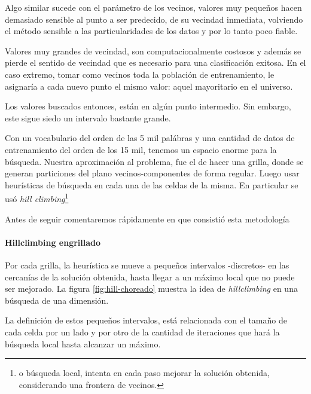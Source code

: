 Algo similar sucede con el parámetro de los vecinos, valores muy
pequeños hacen demasiado sensible al punto a ser predecido, de su
vecindad inmediata, volviendo el método sensible a las
particularidades de los datos y por lo tanto poco fiable.

Valores muy grandes de vecindad, son computacionalmente costosos y
además se pierde el sentido de vecindad que es necesario para una
clasificación exitosa. En el caso extremo, tomar como vecinos toda la
población de entrenamiento, le asignaría a cada nuevo punto el mismo
valor: aquel mayoritario en el universo.

Los valores buscados entonces, están en algún punto intermedio. Sin
embargo, este sigue siedo un intervalo bastante grande.

Con un vocabulario del orden de las 5 mil palábras y una cantidad de
datos de entrenamiento del orden de los 15 mil, tenemos un espacio
enorme para la búsqueda. Nuestra aproximación al problema, fue el de
hacer una grilla, donde se generan particiones del plano
vecinos-componentes de forma regular. Luego usar heurísticas de
búsqueda en cada una de las celdas de la misma. En particular se usó
\emph{hill climbing}\cite{aiama}\footnote{o búsqueda local, intenta en
  cada paso mejorar la solución obtenida, considerando una frontera de
  vecinos.}

Antes de seguir comentaremos rápidamente en que consistió esta metodología

\paragraph{Hillclimbing engrillado}

Por cada grilla, la heurística se mueve a pequeños intervalos
-discretos- en las cercanías de la solución obtenida, hasta llegar a
un máximo local que no puede ser mejorado.  La figura
\ref{fig:hill-choreado} muestra la idea de \emph{hillclimbing} en una
búsqueda de una dimensión.

La definición de estos pequeños intervalos, está relacionada con el
tamaño de cada celda por un lado y por otro de la cantidad de
iteraciones que hará la búsqueda local hasta alcanzar un máximo.

